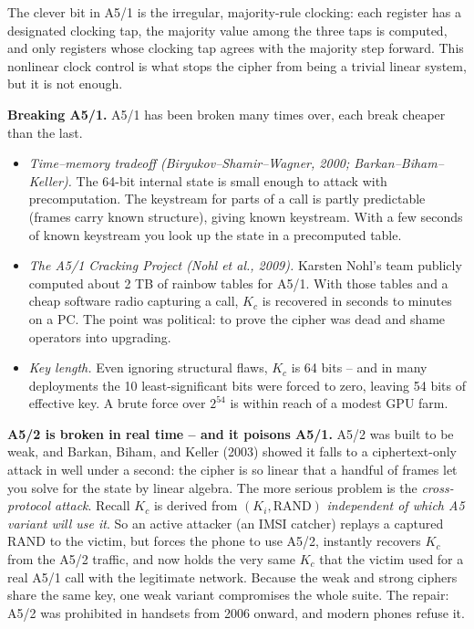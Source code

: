 The clever bit in A5/1 is the irregular, majority-rule clocking: each register has a designated clocking tap, the majority value among the three taps is computed, and only registers whose clocking tap agrees with the majority step forward. This nonlinear clock control is what stops the cipher from being a trivial linear system, but it is not enough.

\begin{attackbox}
\textbf{Breaking A5/1.} A5/1 has been broken many times over, each break cheaper than the last.
\begin{itemize}
  \item \emph{Time--memory tradeoff (Biryukov--Shamir--Wagner, 2000; Barkan--Biham--Keller).} The 64-bit internal state is small enough to attack with precomputation. The keystream for parts of a call is partly predictable (frames carry known structure), giving known keystream. With a few seconds of known keystream you look up the state in a precomputed table.
  \item \emph{The A5/1 Cracking Project (Nohl et al., 2009).} Karsten Nohl's team publicly computed about 2 TB of rainbow tables for A5/1. With those tables and a cheap software radio capturing a call, $K_c$ is recovered in seconds to minutes on a PC. The point was political: to prove the cipher was dead and shame operators into upgrading.
  \item \emph{Key length.} Even ignoring structural flaws, $K_c$ is 64 bits -- and in many deployments the 10 least-significant bits were forced to zero, leaving 54 bits of effective key. A brute force over $2^{54}$ is within reach of a modest GPU farm.
\end{itemize}
\end{attackbox}

\begin{attackbox}
\textbf{A5/2 is broken in real time -- and it poisons A5/1.} A5/2 was built to be weak, and Barkan, Biham, and Keller (2003) showed it falls to a ciphertext-only attack in well under a second: the cipher is so linear that a handful of frames let you solve for the state by linear algebra. The more serious problem is the \emph{cross-protocol attack}. Recall $K_c$ is derived from $(K_i,\text{RAND})$ \emph{independent of which A5 variant will use it}. So an active attacker (an IMSI catcher) replays a captured RAND to the victim, but forces the phone to use A5/2, instantly recovers $K_c$ from the A5/2 traffic, and now holds the very same $K_c$ that the victim used for a real A5/1 call with the legitimate network. Because the weak and strong ciphers share the same key, one weak variant compromises the whole suite. The repair: A5/2 was prohibited in handsets from 2006 onward, and modern phones refuse it.
\end{attackbox}

